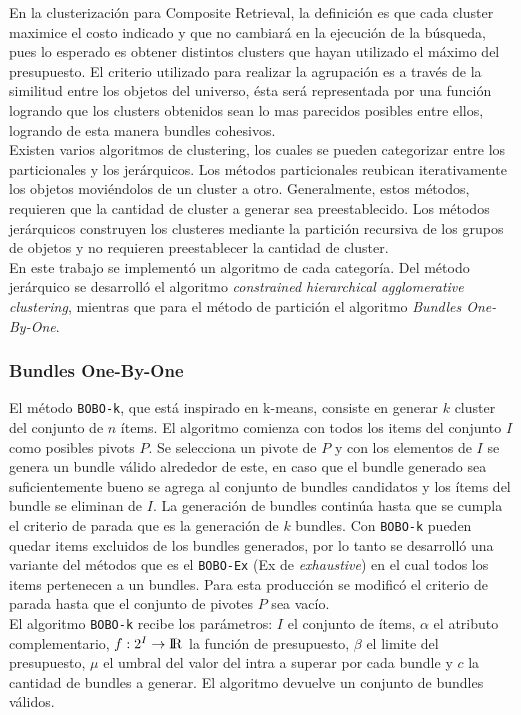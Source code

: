 En la clusterización para Composite Retrieval, la definición es que cada cluster maximice el costo indicado y que no cambiará en la ejecución de la búsqueda, pues lo esperado es obtener distintos clusters que hayan utilizado el máximo del presupuesto. El criterio utilizado para realizar la agrupación es a través de la similitud entre los objetos del universo, ésta será representada por una función logrando que los clusters obtenidos sean lo mas parecidos posibles entre ellos, logrando de esta manera bundles cohesivos.\\
Existen varios algoritmos de clustering, los cuales se pueden categorizar entre los particionales y los jerárquicos. Los métodos particionales reubican iterativamente los objetos moviéndolos de un cluster a otro. Generalmente, estos métodos, requieren que la cantidad de cluster a generar sea preestablecido. Los métodos jerárquicos construyen los clusteres mediante la partición recursiva de los grupos de objetos y no requieren preestablecer la cantidad de cluster.\\
En este trabajo se implementó un algoritmo de cada categoría. Del método jerárquico se desarrolló el algoritmo \textit{constrained hierarchical agglomerative clustering}, mientras que para el método de partición el algoritmo \textit{Bundles One-By-One}.\\

\subsubsection{Bundles One-By-One}
El método \texttt{BOBO-k}, que está inspirado en k-means, consiste en generar $k$ cluster del conjunto de $n$ ítems. El algoritmo comienza con todos los items del conjunto $I$ como posibles pivots $P$. Se selecciona un pivote de $P$ y con los elementos de $I$ se genera un bundle válido alrededor de este, en caso que el bundle generado sea suficientemente bueno se agrega al conjunto de bundles candidatos y los ítems del bundle se eliminan de $I$. La generación de bundles continúa hasta que se cumpla el criterio de parada que es la generación de $k$ bundles. Con \texttt{BOBO-k} pueden quedar items excluidos de los bundles generados, por lo tanto se desarrolló una variante del métodos que es el \texttt{BOBO-Ex} (Ex de \textit{exhaustive}) en el cual todos los items pertenecen a un bundles. Para esta producción se modificó el criterio de parada hasta que el conjunto de pivotes $P$ sea vacío.\\

El algoritmo \texttt{BOBO-k} recibe los parámetros: $I$ el conjunto de ítems, $\alpha$ el atributo complementario, $f: 2^{I} \rightarrow \rm I \!R$ la función de presupuesto, $\beta$ el limite del presupuesto, $\mu$ el umbral del valor del intra a superar por cada bundle y $c$ la cantidad de bundles a generar. El algoritmo devuelve un conjunto de bundles válidos.\\

